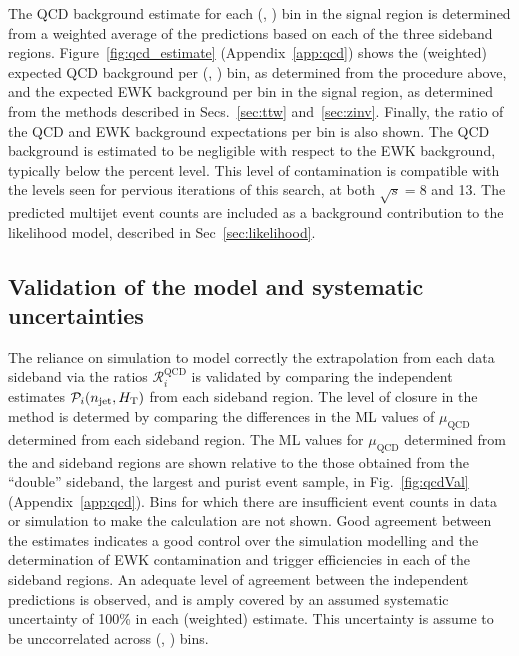 The QCD background estimate for each (\njet, \scalht) bin in the
signal region is determined from a weighted average of the predictions
based on each of the three sideband regions. 
Figure~\ref{fig:qcd_estimate} (Appendix~\ref{app:qcd}) shows the
(weighted) expected QCD background per (\njet, \scalht) bin, as
determined from the procedure above, and the expected EWK background
per bin in the signal region, as determined from the methods described
in Secs.~\ref{sec:ttw} and~\ref{sec:zinv}. Finally, the ratio of the
QCD and EWK background expectations per bin is also shown. The QCD
background is estimated to be negligible with respect to the EWK
background, typically below the percent level. This level of
contamination is compatible with the levels seen for pervious
iterations of this search, at both $\sqrt{s} = 8$ and 13\TeV. The
predicted multijet event counts are included as a background
contribution to the likelihood model, described in
Sec~\ref{sec:likelihood}.

\subsection{Validation of the model and systematic uncertainties}
\label{sec:qcdValidation}

The reliance on simulation to model correctly the extrapolation from
each data sideband via the ratios $\mathcal{R}_i^\mathrm{QCD}$ is
validated by comparing the independent estimates $\mathcal{P}_i(n_{\text{jet}},
\mbox{$H_\text{T}$})$ from each sideband region. The level of closure in the
method is determed by comparing the differences in the ML values of
$\mu_{\textrm{QCD}}$ determined from each sideband region. The ML
values for $\mu_{\textrm{QCD}}$ determined from the \mhtmet and \bdphi
sideband regions are shown relative to the those obtained from the
``double'' sideband, the largest and purist event sample, in
Fig.~\ref{fig:qcdVal} (Appendix~\ref{app:qcd}). Bins for which there
are insufficient event counts in data or simulation to make the
calculation are not shown. Good agreement between the estimates
indicates a good control over the simulation modelling and the
determination of EWK contamination and trigger efficiencies in each of
the sideband regions. An adequate level of agreement between the
independent predictions is observed, and is amply covered by an
assumed systematic uncertainty of 100\% in each (weighted)
estimate. This uncertainty is assume to be unccorrelated across
(\njet, \scalht) bins.

